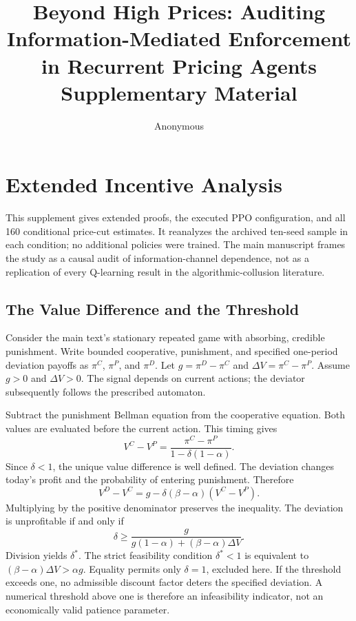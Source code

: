 \documentclass{article}
\title{Beyond High Prices: Auditing Information-Mediated Enforcement in Recurrent Pricing Agents \\ \large Supplementary Material}
\author{Anonymous}
\begin{document}
\maketitle

\appendix

\section{Extended Incentive Analysis}

This supplement gives extended proofs, the executed PPO configuration, and all 160 conditional price-cut estimates. It reanalyzes the archived ten-seed sample in each condition; no additional policies were trained. The main manuscript frames the study as a causal audit of information-channel dependence, not as a replication of every Q-learning result in the algorithmic-collusion literature.

\subsection{The Value Difference and the Threshold}

Consider the main text's stationary repeated game with absorbing, credible punishment. Write bounded cooperative, punishment, and specified one-period deviation payoffs as $\pi^C$, $\pi^P$, and $\pi^D$. Let $g = \pi^D - \pi^C$ and $\Delta V = \pi^C - \pi^P$. Assume $g > 0$ and $\Delta V > 0$. The signal depends on current actions; the deviator subsequently follows the prescribed automaton.

Subtract the punishment Bellman equation from the cooperative equation. Both values are evaluated before the current action. This timing gives
\[
V^C - V^P = \frac{\pi^C - \pi^P}{1 - \delta(1 - \alpha)}.
\]
Since $\delta < 1$, the unique value difference is well defined. The deviation changes today's profit and the probability of entering punishment. Therefore
\[
V^D - V^C = g - \delta(\beta - \alpha)(V^C - V^P).
\]
Multiplying by the positive denominator preserves the inequality. The deviation is unprofitable if and only if
\[
\delta \geq \frac{g}{g(1 - \alpha) + (\beta - \alpha)\Delta V}.
\]
Division yields $\delta^*$. The strict feasibility condition $\delta^* < 1$ is equivalent to $(\beta - \alpha)\Delta V > \alpha g$. Equality permits only $\delta = 1$, excluded here. If the threshold exceeds one, no admissible discount factor deters the specified deviation. A numerical threshold above one is therefore an infeasibility indicator, not an economically valid patience parameter.
\end{document}
